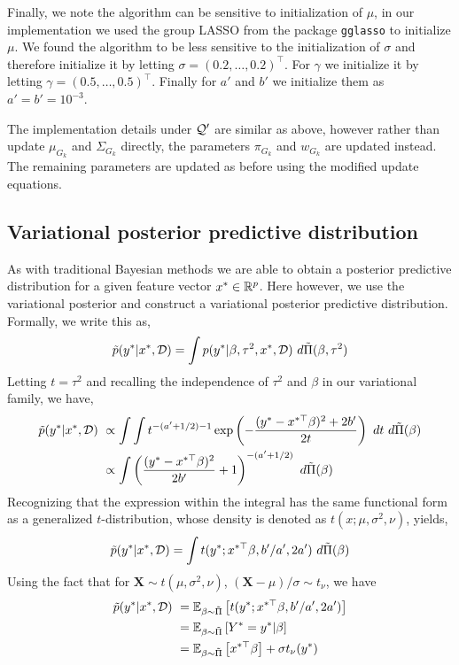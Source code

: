 Finally, we note the algorithm can be sensitive to initialization of $\mu$, in our implementation we used the group LASSO from the package \texttt{gglasso} to initialize $\mu$. We found the algorithm to be less sensitive to the initialization of $\sigma$ and therefore initialize it by letting $\sigma = (0.2,\dots, 0.2)^\top$. For $\gamma$ we initialize it by letting $\gamma = (0.5, \dots, 0.5)^\top$. Finally for $a'$ and $b'$ we initialize them as $a' = b' = 10^{-3}$.

The implementation details under $\mathcal{Q}'$ are similar as above, however rather than update $\mu_{G_k}$ and $\Sigma_{G_k}$ directly, the parameters $\pi_{G_k}$ and $w_{G_k}$ are updated instead. The remaining parameters are updated as before using the modified update equations.


\subsection{Variational posterior predictive distribution}

As with traditional Bayesian methods we are able to obtain a posterior predictive distribution for a given feature vector $x^\ast \in \mathbb{R}^p$. Here however, we use the variational posterior and construct a variational posterior predictive distribution. Formally, we write this as,
\begin{equation}
    \tilde{p} (y^\ast | x^\ast, \mathcal{D}) 
	= \int p(y^\ast | \beta, \tau^2, x^\ast, \mathcal{D}) \ d\tilde{\Pi}(\beta, \tau^2)
\end{equation}
Letting $t = \tau^2$ and recalling the independence of $\tau^2$ and $\beta$ in our variational family, we have,
\begin{align}
    \tilde{p} (y^\ast | x^\ast, \mathcal{D}) 
    &\ \propto
    \int \int t^{-(a' + 1/2) -1} \exp \left( - \frac{(y^\ast - x^{\ast \top} \beta)^2 + 2b'}{2 t} \right)
    \ dt \ d\tilde{\Pi}(\beta)
    \nonumber
    \\
    &\ \propto
    \int \left(\frac{(y^\ast - x^{\ast \top} \beta)^2}{2b'} + 1 \right)^{-(a' + 1/2)} \ d\tilde{\Pi}(\beta)
    \nonumber
\end{align}
Recognizing that the expression within the integral has the same functional form as a generalized $t$-distribution, whose density is denoted as $t(x; \mu, \sigma^2, \nu)$, yields,
\begin{equation} \label{eq:post_pred} 
    \tilde{p} (y^\ast | x^\ast, \D) 
	= \int t(y^\ast; x^{\ast \top} \beta, b'/a', 2a') \ d\tilde{\Pi}(\beta)
\end{equation}
Using the fact that for $\boldsymbol{X} \sim t(\mu, \sigma^2, \nu)$, $(\boldsymbol{X} - \mu)/ \sigma \sim t_\nu$, we have
\begin{align}
    \tilde{p} (y^\ast | x^\ast, \mathcal{D}) 
	&\ = \mathbb{E}_{\beta \sim \tilde{\Pi}} \left[ t(y^\ast; x^{\ast \top} \beta, b'/a', 2a') \right]
    \nonumber
    \\
    &\ = \mathbb{E}_{\beta \sim \tilde{\Pi}} \left[ Y^\ast= y^\ast | \beta \right]
    \nonumber
    \\
    &\ = \mathbb{E}_{\beta \sim \tilde{\Pi}} \left[ x^{\ast \top} \beta \right] + \sigma t_\nu(y^\ast)
\end{align}

